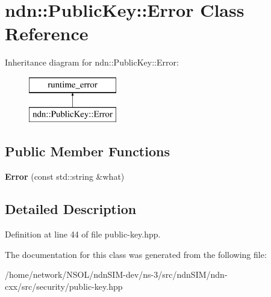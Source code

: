 \hypertarget{classndn_1_1PublicKey_1_1Error}{}\section{ndn\+:\+:Public\+Key\+:\+:Error Class Reference}
\label{classndn_1_1PublicKey_1_1Error}
Inheritance diagram for ndn\+:\+:Public\+Key\+:\+:Error\+:\begin{figure}[H]
\begin{center}
\leavevmode
\includegraphics[height=2.000000cm]{classndn_1_1PublicKey_1_1Error}
\end{center}
\end{figure}
\subsection*{Public Member Functions}
\begin{DoxyCompactItemize}
\item 
{\bfseries Error} (const std\+::string \&what)\hypertarget{classndn_1_1PublicKey_1_1Error_aa3847e84db15cce7e1e3dd68d65b4573}{}\label{classndn_1_1PublicKey_1_1Error_aa3847e84db15cce7e1e3dd68d65b4573}

\end{DoxyCompactItemize}


\subsection{Detailed Description}


Definition at line 44 of file public-\/key.\+hpp.



The documentation for this class was generated from the following file\+:\begin{DoxyCompactItemize}
\item 
/home/network/\+N\+S\+O\+L/ndn\+S\+I\+M-\/dev/ns-\/3/src/ndn\+S\+I\+M/ndn-\/cxx/src/security/public-\/key.\+hpp\end{DoxyCompactItemize}
